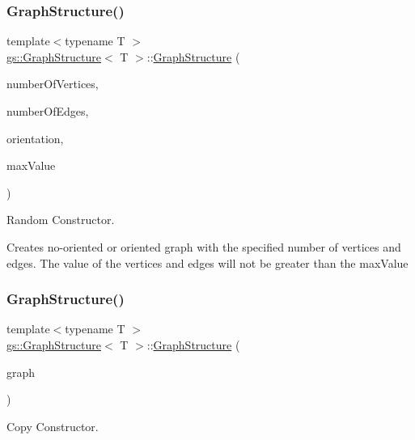 \subsubsection{\texorpdfstring{Graph\+Structure()}{GraphStructure()}\hspace{0.1cm}{\footnotesize\ttfamily [3/4]}}
{\footnotesize\ttfamily template$<$typename T $>$ \\
\mbox{\hyperlink{classgs_1_1_graph_structure}{gs\+::\+Graph\+Structure}}$<$ T $>$\+::\mbox{\hyperlink{classgs_1_1_graph_structure}{Graph\+Structure}} (\begin{DoxyParamCaption}\item[{std\+::size\+\_\+t}]{number\+Of\+Vertices,  }\item[{std\+::size\+\_\+t}]{number\+Of\+Edges,  }\item[{bool}]{orientation,  }\item[{const T \&}]{max\+Value }\end{DoxyParamCaption})}



Random Constructor. 

Creates no-\/oriented or oriented graph with the specified number of vertices and edges. The value of the vertices and edges will not be greater than the max\+Value \mbox{\label{classgs_1_1_graph_structure_a30f102d272103f65b86945164bd99e0e}} 
\subsubsection{\texorpdfstring{Graph\+Structure()}{GraphStructure()}\hspace{0.1cm}{\footnotesize\ttfamily [4/4]}}
{\footnotesize\ttfamily template$<$typename T $>$ \\
\mbox{\hyperlink{classgs_1_1_graph_structure}{gs\+::\+Graph\+Structure}}$<$ T $>$\+::\mbox{\hyperlink{classgs_1_1_graph_structure}{Graph\+Structure}} (\begin{DoxyParamCaption}\item[{const \mbox{\hyperlink{classgs_1_1_graph_structure}{Graph\+Structure}}$<$ T $>$ \&}]{graph }\end{DoxyParamCaption})}



Copy Constructor. 

